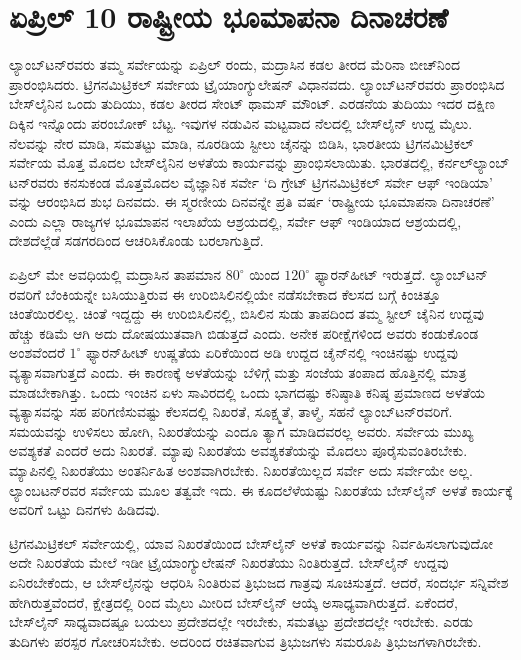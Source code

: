 
\chapter{ಏಪ್ರಿಲ್​ 10 ರಾಷ್ಟ್ರೀಯ ಭೂಮಾಪನಾ ದಿನಾಚರಣೆ}

ಲ್ಯಾಂಬ್​ಟನ್​ರವರು ತಮ್ಮ ಸರ್ವೇಯನ್ನು  ಏಪ್ರಿಲ್​  ರಂದು, ಮದ್ರಾಸಿನ ಕಡಲ ತೀರದ ಮೆರಿನಾ ಬೀಚ್​ನಿಂದ ಪ್ರಾರಂಭಿಸಿದರು. ಟ್ರಿಗನಮಿಟ್ರಿಕಲ್​ ಸರ್ವೇಯ ಟ್ರೈಯಾಂಗ್ಯುಲೇಷನ್​ ವಿಧಾನವದು. ಲ್ಯಾಂಬ್​ಟನ್​ರವರು ಪ್ರಾರಂಭಿಸಿದ ಬೇಸ್​ಲೈನಿನ ಒಂದು ತುದಿಯು, ಕಡಲ ತೀರದ ಸೇಂಟ್​ ಥಾಮಸ್​ ಮೌಂಟ್​. ಎರಡನೆಯ ತುದಿಯು ಇದರ ದಕ್ಷಿಣ ದಿಕ್ಕಿನ ಇನ್ನೊಂದು ಪರಂಬೋಕ್​ ಬೆಟ್ಟ. ಇವುಗಳ ನಡುವಿನ ಮಟ್ಟವಾದ ನೆಲದಲ್ಲಿ ಬೇಸ್​ಲೈನ್​ ಉದ್ದ  ಮೈಲು. ನೆಲವನ್ನು ನೇರ ಮಾಡಿ, ಸಮತಟ್ಟು ಮಾಡಿ, ನೂರಡಿಯ ಸ್ಟೀಲು ಚೈನನ್ನು ಬಿಡಿಸಿ, ಭಾರತೀಯ ಟ್ರಿಗನಮಿಟ್ರಿಕಲ್​ ಸರ್ವೇಯ ಮೊತ್ತ ಮೊದಲ ಬೇಸ್​ಲೈನಿನ ಅಳತೆಯ ಕಾರ್ಯವನ್ನು ಪ್ರಾಂಭಿಸಲಾಯಿತು. ಭಾರತದಲ್ಲಿ, ಕರ್ನಲ್​\break ಲ್ಯಾಂಬ್​ಟನ್​ರವರು ಕನಸುಕಂಡ ಮೊತ್ತಮೊದಲ ವೈಜ್ಞಾನಿಕ ಸರ್ವೇ ‘ದಿ ಗ್ರೇಟ್\break ​ ಟ್ರಿಗನಮಿಟ್ರಿಕಲ್​ ಸರ್ವೇ ಆಫ್​ ಇಂಡಿಯಾ’ ವನ್ನು ಆರಂಭಿಸಿದ ಶುಭ ದಿನವದು. ಈ ಸ್ಮರಣೀಯ ದಿನವನ್ನೇ ಪ್ರತಿ ವರ್ಷ ‘ರಾಷ್ಟ್ರೀಯ ಭೂಮಾಪನಾ ದಿನಾಚರಣೆ’ ಎಂದು ಎಲ್ಲಾ ರಾಜ್ಯಗಳ ಭೂಮಾಪನ ಇಲಾಖೆಯ ಆಶ್ರಯದಲ್ಲಿ, ಸರ್ವೇ ಆಫ್​ ಇಂಡಿಯಾದ ಆಶ್ರಯದಲ್ಲಿ, ದೇಶದೆಲ್ಲೆಡೆ ಸಡಗರದಿಂದ ಆಚರಿಸಿಕೊಂಡು ಬರಲಾಗುತ್ತಿದೆ.

ಏಪ್ರಿಲ್​ ಮೇ ಅವಧಿಯಲ್ಲಿ ಮದ್ರಾಸಿನ ತಾಪಮಾನ $80^\circ$ ಯಿಂದ $120^\circ$ ಫ್ಯಾರನ್​\break ಹೀಟ್​ ಇರುತ್ತದೆ. ಲ್ಯಾಂಬ್​ಟನ್​ರವರಿಗೆ ಬೆಂಕಿಯನ್ನೇ ಬಸಿಯುತ್ತಿರುವ ಈ ಉರಿಬಿಸಿಲಿನಲ್ಲಿಯೇ ನಡೆಸಬೇಕಾದ ಕೆಲಸದ ಬಗ್ಗೆ ಕಿಂಚಿತ್ತೂ ಚಿಂತೆಯಿರಲಿಲ್ಲ. ಚಿಂತೆ ಇದ್ದದ್ದು ಈ ಉರಿಬಿಸಿಲಿನಲ್ಲಿ, ಬಿಸಿಲಿನ ಸುಡು ತಾಪದಿಂದ ತಮ್ಮ ಸ್ಟೀಲ್​ ಚೈನಿನ ಉದ್ದವು ಹೆಚ್ಚು ಕಡಿಮೆ ಆಗಿ ಅದು ದೋಷಯುತವಾಗಿ ಬಿಡುತ್ತದೆ ಎಂದು. ಅನೇಕ ಪರೀಕ್ಷೆಗಳಿಂದ ಅವರು ಕಂಡುಕೊಂಡ ಅಂಶವೆಂದರೆ $1^\circ$ ಫ್ಯಾರನ್​ಹೀಟ್​ ಉಷ್ಣತೆಯ ಏರಿಕೆಯಿಂದ  ಅಡಿ ಉದ್ದದ ಚೈನ್​ನಲ್ಲಿ  ಇಂಚಿನಷ್ಟು ಉದ್ದವು ವ್ಯತ್ಯಾಸವಾಗುತ್ತದೆ ಎಂದು. ಈ ಕಾರಣಕ್ಕೆ ಅಳತೆಯನ್ನು ಬೆಳಿಗ್ಗೆ ಮತ್ತು ಸಂಜೆಯ ತಂಪಾದ ಹೊತ್ತಿನಲ್ಲಿ ಮಾತ್ರ ಮಾಡಬೇಕಾಗಿತ್ತು. ಒಂದು ಇಂಚಿನ ಏಳು ಸಾವಿರದಲ್ಲಿ ಒಂದು ಭಾಗದಷ್ಟು ಕನಿಷ್ಠಾತಿ ಕನಿಷ್ಠ ಪ್ರಮಾಣದ ಅಳತೆಯ ವ್ಯತ್ಯಾಸವನ್ನು ಸಹ ಪರಿಗಣಿಸುವಷ್ಟು ಕೆಲಸದಲ್ಲಿ ನಿಖರತೆ, ಸೂಕ್ಷ್ಮತೆ, ತಾಳ್ಮೆ, ಸಹನೆ ಲ್ಯಾಂಬ್​ಟನ್​ರವರಿಗೆ. ಸಮಯವನ್ನು ಉಳಿಸಲು ಹೋಗಿ, ನಿಖರತೆಯನ್ನು ಎಂದೂ ತ್ಯಾಗ ಮಾಡಿದವರಲ್ಲ ಅವರು. ಸರ್ವೇಯ ಮುಖ್ಯ ಅವಶ್ಯಕತೆ ಎಂದರೆ ಅದು ನಿಖರತೆ. ಮ್ಯಾಪು ನಿಖರತೆಯ ಅವಶ್ಯಕತೆಯನ್ನು ಮೊದಲು ಪೂರೈಸುವಂತಿರಬೇಕು. ಮ್ಯಾಪಿನಲ್ಲಿ ನಿಖರತೆಯು ಅಂತರ್ನಿಹಿತ ಅಂಶವಾಗಿರಬೇಕು. ನಿಖರತೆಯಿಲ್ಲದ ಸರ್ವೇ ಅದು ಸರ್ವೇಯೇ ಅಲ್ಲ. ಲ್ಯಾಂಬಟನ್​ರವರ ಸರ್ವೇಯ ಮೂಲ ತತ್ವವೇ ಇದು. ಈ ಕೂದಲೆಳೆಯಷ್ಟು ನಿಖರತೆಯ ಬೇಸ್​ಲೈನ್​ ಅಳತೆ ಕಾರ್ಯಕ್ಕೆ ಅವರಿಗೆ ಒಟ್ಟು  ದಿನಗಳು ಹಿಡಿದವು.

ಟ್ರಿಗನಮಿಟ್ರಿಕಲ್​ ಸರ್ವೇಯಲ್ಲಿ, ಯಾವ ನಿಖರತೆಯಿಂದ ಬೇಸ್‌ಲೈನ್​ ಅಳತೆ ಕಾರ್ಯವನ್ನು ನಿರ್ವಹಿಸಲಾಗುವುದೋ ಅದೇ ನಿಖರತೆಯ ಮೇಲೆ ಇಡೀ ಟ್ರೈಯಾಂಗ್ಯುಲೇಷನ್​ ನಿಖರತೆಯು ನಿಂತಿರುತ್ತದೆ. ಬೇಸ್‌ಲೈನ್​ ಉದ್ದವು ಏನಿರಬೇಕೆಂದು, ಆ ಬೇಸ್‌ಲೈನನ್ನು ಆಧರಿಸಿ ನಿಂತಿರುವ ತ್ರಿಭುಜದ ಗಾತ್ರವು ಸೂಚಿಸುತ್ತದೆ. ಆದರೆ, ಸಂದರ್ಭ ಸನ್ನಿವೇಶ ಹೇಗಿರುತ್ತವೆಂದರೆ, ಕ್ಷೇತ್ರದಲ್ಲಿ  ರಿಂದ  ಮೈಲು ಮೀರಿದ ಬೇಸ್‌ಲೈನ್​ ಆಯ್ಕೆ ಅಸಾಧ್ಯವಾಗಿರುತ್ತದೆ. ಏಕೆಂದರೆ, ಬೇಸ್‌ಲೈನ್​ ಸಾಧ್ಯವಾದಷ್ಟೂ ಬಯಲು ಪ್ರದೇಶದಲ್ಲೇ ಇರಬೇಕು, ಸಮತಟ್ಟು ಪ್ರದೇಶದಲ್ಲೇ ಇರಬೇಕು. ಎರಡು ತುದಿಗಳು ಪರಸ್ಪರ ಗೋಚರಿಸಬೇಕು. ಅದರಿಂದ ರಚಿತವಾಗುವ ತ್ರಿಭುಜಗಳು ಸಮರೂಪಿ ತ್ರಿಭುಜಗಳಾಗಿರಬೇಕು.

